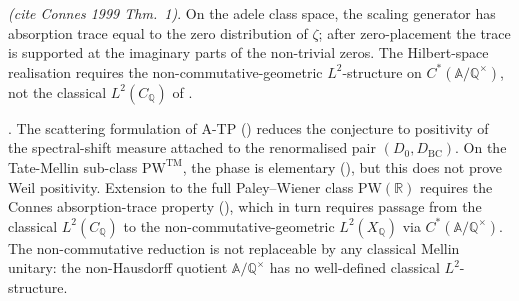 \begin{proposition}
\label{v4-arith:w7-j:prop:connes-absorption}
\ClaimStatusProvedElsewhere \emph{(cite Connes 1999 Thm.~1)}. On the
adele class space, the scaling generator has absorption trace equal to
the zero distribution of \(\zeta\); after zero-placement the trace is
supported at the imaginary parts of the non-trivial zeros. The
Hilbert-space realisation requires the
non-commutative-geometric \(L^{2}\)-structure on
\(C^{*}(\mathbb{A}/\mathbb{Q}^{\times})\), not the classical
\(L^{2}(C_{\mathbb{Q}})\) of .
\end{proposition}

\begin{theorem}
\label{v4-arith:w7-j:thm:obstruction-located}
\ClaimStatusProvedHereConditional. The scattering formulation of A-TP
() reduces the conjecture to
positivity of the spectral-shift measure attached to the renormalised
pair \((D_{0},D_{\mathrm{BC}})\). On the Tate-Mellin sub-class
\(\mathrm{PW}^{\mathrm{TM}}\), the phase is elementary
(), but this does not prove
Weil positivity. Extension to the full Paley--Wiener class
\(\mathrm{PW}(\mathbb{R})\) requires the Connes absorption-trace
property
(), which in turn
requires passage from the classical \(L^{2}(C_{\mathbb{Q}})\) to the
non-commutative-geometric \(L^{2}(X_{\mathbb{Q}})\) via
\(C^{*}(\mathbb{A}/\mathbb{Q}^{\times})\). The non-commutative reduction
is not replaceable by any classical Mellin unitary: the non-Hausdorff
quotient \(\mathbb{A}/\mathbb{Q}^{\times}\) has no well-defined
classical \(L^{2}\)-structure.
\end{theorem}

